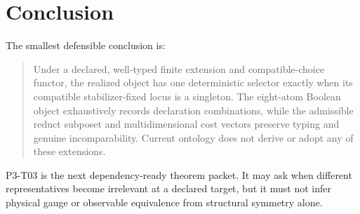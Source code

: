 \documentclass[11pt]{article}
\begin{document}
\section{Conclusion}

The smallest defensible conclusion is:

\begin{quote}
Under a declared, well-typed finite extension and compatible-choice functor,
the realized object has one deterministic selector exactly when its compatible
stabilizer-fixed locus is a singleton.  The eight-atom Boolean object
exhaustively records declaration combinations, while the admissible reduct
subposet and multidimensional cost vectors preserve typing and genuine
incomparability.  Current ontology does not derive or adopt any of these
extensions.
\end{quote}

P3-T03 is the next dependency-ready theorem packet.  It may ask when different
representatives become irrelevant at a declared target, but it must not infer
physical gauge or observable equivalence from structural symmetry alone.
\end{document}
